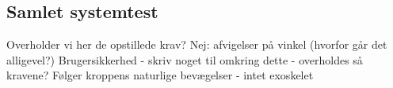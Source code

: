 



\subsection{Samlet systemtest}
Overholder vi her de opstillede krav? 
Nej: afvigelser på vinkel (hvorfor går det alligevel?)
Brugersikkerhed - skriv noget til omkring dette - overholdes så kravene? 
Følger kroppens naturlige bevægelser - intet exoskelet
